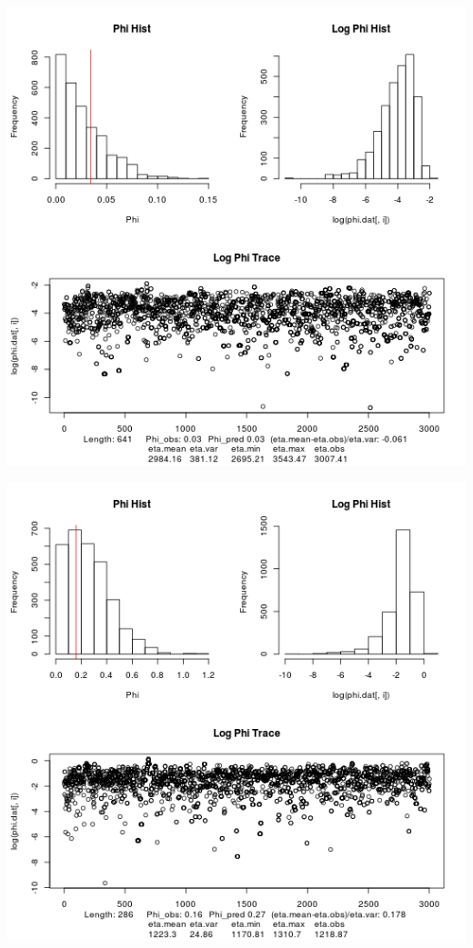 \documentclass{article}
\begin{document}
 	\includegraphics[scale=0.5]{../chosen_100/3000_steps/BIS10/reflnorm_prop/hist/21_phi_hist.png}
 	
 	\includegraphics[scale=0.5]{../chosen_100/3000_steps/BIS10/reflnorm_prop/hist/83_phi_hist.png}
 	
\end{document}
